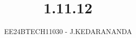 \documentclass[journal]{IEEEtran}
\begin{document}

\vspace{3cm}

\title{1.11.12}
\author{EE24BTECH11030 - J.KEDARANANDA}
{\let\newpage\relax\maketitle}

\renewcommand{\thefigure}{\theenumi}
\renewcommand{\thetable}{\theenumi}
\setlength{\intextsep}{10pt} %


\renewcommand{\thetable}{\theenumi}
\end{document}
